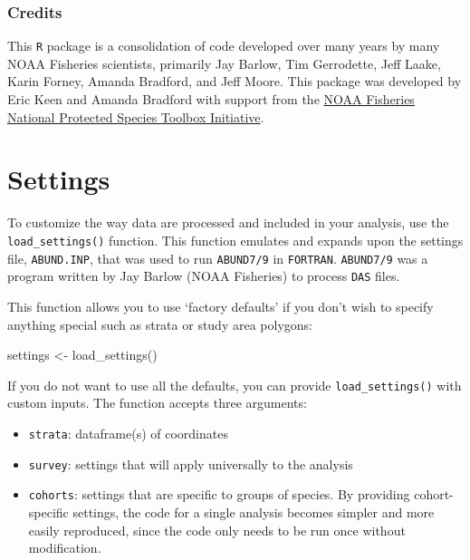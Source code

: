 \documentclass[
]{book}
\newenvironment{Shaded}{\begin{snugshade}}{\end{snugshade}}
\newcommand{\FunctionTok}[1]{\textcolor[rgb]{0.00,0.00,0.00}{#1}}
\newcommand{\NormalTok}[1]{#1}
\newcommand{\OtherTok}[1]{\textcolor[rgb]{0.56,0.35,0.01}{#1}}
\begin{document}
\hypertarget{credits}{%
\subsection*{Credits}\label{credits}}

This \texttt{R} package is a consolidation of code developed over many years by many NOAA Fisheries scientists, primarily Jay Barlow, Tim Gerrodette, Jeff Laake, Karin Forney, Amanda Bradford, and Jeff Moore. This package was developed by Eric Keen and Amanda Bradford with support from the \href{https://www.fisheries.noaa.gov/national/population-assessments/national-protected-species-toolbox-initiative}{NOAA Fisheries National Protected Species Toolbox Initiative}.

\hypertarget{settings}{%
\chapter{Settings}\label{settings}}

To customize the way data are processed and included in your analysis, use the \texttt{load\_settings()} function. This function emulates and expands upon the settings file, \texttt{ABUND.INP}, that was used to run \texttt{ABUND7/9} in \texttt{FORTRAN}. \texttt{ABUND7/9} was a program written by Jay Barlow (NOAA Fisheries) to process \texttt{DAS} files.

This function allows you to use `factory defaults' if you don't wish to specify anything special such as strata or study area polygons:

\begin{Shaded}
\begin{Highlighting}[]
\NormalTok{settings }\OtherTok{\textless{}{-}} \FunctionTok{load\_settings}\NormalTok{()}
\end{Highlighting}
\end{Shaded}

If you do not want to use all the defaults, you can provide \texttt{load\_settings()} with custom inputs. The function accepts three arguments:

\begin{itemize}
\item
  \texttt{strata}: dataframe(s) of coordinates
\item
  \texttt{survey}: settings that will apply universally to the analysis
\item
  \texttt{cohorts}: settings that are specific to groups of species. By providing cohort-specific settings, the code for a single analysis becomes simpler and more easily reproduced, since the code only needs to be run once without modification.
\end{itemize}
\end{document}
